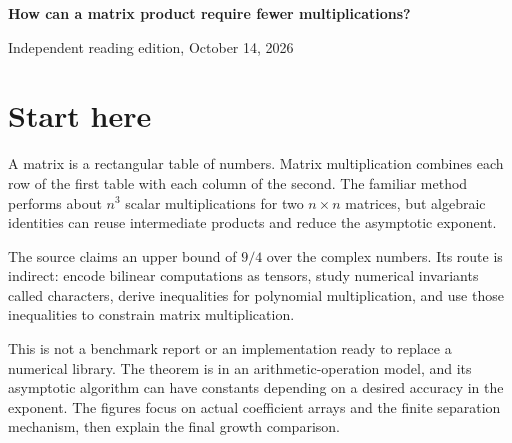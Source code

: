 \documentclass[11pt]{article}
\begin{document}
\begin{center}{\LARGE\bfseries How can a matrix product require fewer multiplications?}\par\vspace{12pt}{\large An illustrated reader for the source's 9/4 exponent argument}\par\vspace{16pt}Independent reading edition, October 14, 2026\end{center}
\section*{Start here}A matrix is a rectangular table of numbers. Matrix multiplication combines each row of the first table with each column of the second. The familiar method performs about $n^3$ scalar multiplications for two $n\times n$ matrices, but algebraic identities can reuse intermediate products and reduce the asymptotic exponent.

The source claims an upper bound of $9/4$ over the complex numbers. Its route is indirect: encode bilinear computations as tensors, study numerical invariants called characters, derive inequalities for polynomial multiplication, and use those inequalities to constrain matrix multiplication.

This is not a benchmark report or an implementation ready to replace a numerical library. The theorem is in an arithmetic-operation model, and its asymptotic algorithm can have constants depending on a desired accuracy in the exponent. The figures focus on actual coefficient arrays and the finite separation mechanism, then explain the final growth comparison.
\end{document}
